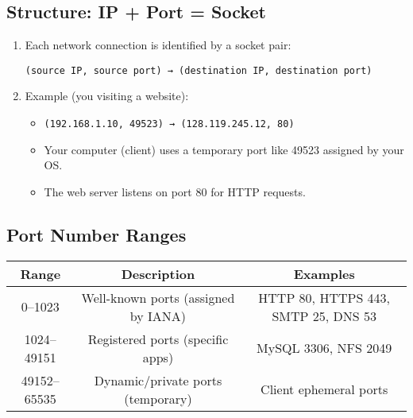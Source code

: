 \documentclass[12pt]{article}
\begin{document}
\subsection{Structure: IP + Port = Socket}
\begin{enumerate}
    \item Each network connection is identified by a socket pair:
          \begin{verbatim}
(source IP, source port) → (destination IP, destination port)
          \end{verbatim}
    \item Example (you visiting a website):
          \begin{itemize}
              \item \begin{verbatim}
(192.168.1.10, 49523) → (128.119.245.12, 80)
                    \end{verbatim}
              \item Your computer (client) uses a temporary port like 49523 assigned by your OS.
              \item The web server listens on port 80 for HTTP requests.
          \end{itemize}
\end{enumerate}

\subsection{Port Number Ranges}
\begin{center}
    \begin{tabular}{|c|c|c|}
        \hline
        \textbf{Range} & \textbf{Description}                & \textbf{Examples}                   \\
        \hline
        0--1023        & Well-known ports (assigned by IANA) & HTTP 80, HTTPS 443, SMTP 25, DNS 53 \\
        1024--49151    & Registered ports (specific apps)    & MySQL 3306, NFS 2049                \\
        49152--65535   & Dynamic/private ports (temporary)   & Client ephemeral ports              \\
        \hline
    \end{tabular}
\end{center}
\end{document}
